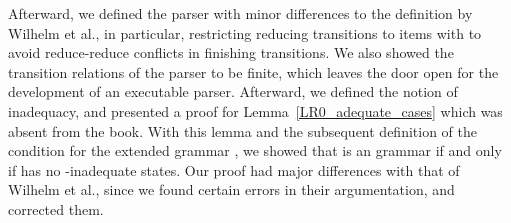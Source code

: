 \begin{isabellebody}
\begin{isamarkuptext}
Afterward, we defined the  parser  with minor differences to the definition by
Wilhelm et al., in particular, restricting reducing transitions to items  with 
 to avoid reduce-reduce conflicts in finishing transitions. We also showed the
transition relations of the parser to be finite, which leaves the door open for the development of
an executable  parser. Afterward, we defined the notion of  inadequacy,
and presented a proof for Lemma~\ref{LR0_adequate_cases} which was absent from the book. With this
lemma and the subsequent definition of the  condition for the extended grammar , we showed
that  is an  grammar if and only if  has no -inadequate states. Our
proof had major differences with that of Wilhelm et al., since we found certain errors in their
argumentation, and corrected them. 


\end{isamarkuptext}
\end{isabellebody}
